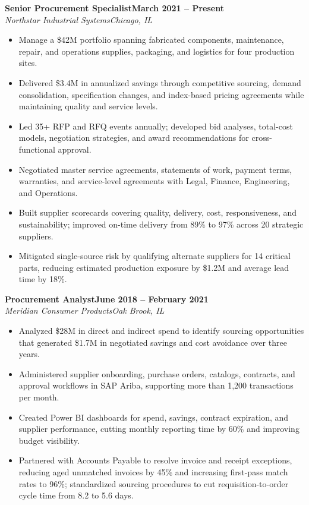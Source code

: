\documentclass[10pt,letterpaper]{article}
\newcommand{\job}[4]{%
  \textbf{#1}\hfill\textbf{#2}\\[-1pt]
  \textit{#3}\hfill\textit{#4}\par
}
\begin{document}
\job{Senior Procurement Specialist}{March 2021 -- Present}{Northstar Industrial Systems}{Chicago, IL}
\begin{itemize}
  \item Manage a \$42M portfolio spanning fabricated components, maintenance, repair, and operations supplies, packaging, and logistics for four production sites.
  \item Delivered \$3.4M in annualized savings through competitive sourcing, demand consolidation, specification changes, and index-based pricing agreements while maintaining quality and service levels.
  \item Led 35+ RFP and RFQ events annually; developed bid analyses, total-cost models, negotiation strategies, and award recommendations for cross-functional approval.
  \item Negotiated master service agreements, statements of work, payment terms, warranties, and service-level agreements with Legal, Finance, Engineering, and Operations.
  \item Built supplier scorecards covering quality, delivery, cost, responsiveness, and sustainability; improved on-time delivery from 89\% to 97\% across 20 strategic suppliers.
  \item Mitigated single-source risk by qualifying alternate suppliers for 14 critical parts, reducing estimated production exposure by \$1.2M and average lead time by 18\%.
\end{itemize}

\job{Procurement Analyst}{June 2018 -- February 2021}{Meridian Consumer Products}{Oak Brook, IL}
\begin{itemize}
  \item Analyzed \$28M in direct and indirect spend to identify sourcing opportunities that generated \$1.7M in negotiated savings and cost avoidance over three years.
  \item Administered supplier onboarding, purchase orders, catalogs, contracts, and approval workflows in SAP Ariba, supporting more than 1,200 transactions per month.
  \item Created Power BI dashboards for spend, savings, contract expiration, and supplier performance, cutting monthly reporting time by 60\% and improving budget visibility.
  \item Partnered with Accounts Payable to resolve invoice and receipt exceptions, reducing aged unmatched invoices by 45\% and increasing first-pass match rates to 96\%; standardized sourcing procedures to cut requisition-to-order cycle time from 8.2 to 5.6 days.
\end{itemize}
\end{document}
